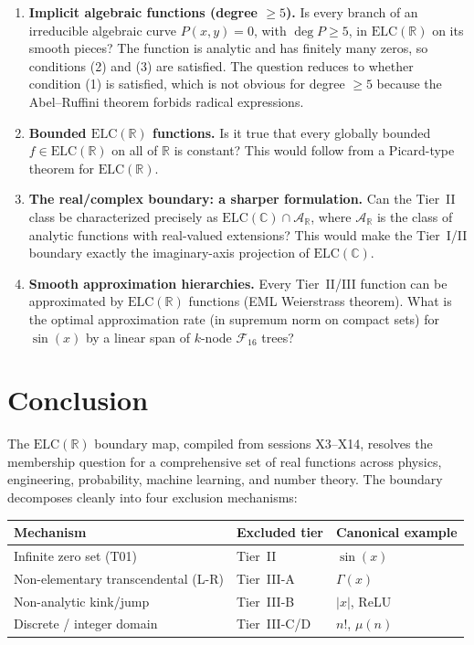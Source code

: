 \documentclass[12pt,a4paper]{article}
\theoremstyle{definition}
\newcommand{\ELC}{\mathrm{ELC}(\mathbb{R})}
\newcommand{\ELCcx}{\mathrm{ELC}(\mathbb{C})}
\newcommand{\R}{\mathbb{R}}
\newcommand{\F}{\mathcal{F}_{16}}
\begin{document}
\begin{enumerate}[label=\textbf{Q\arabic*.}, itemsep=6pt]

\item \textbf{Implicit algebraic functions (degree $\ge 5$).}
  Is every branch of an irreducible algebraic curve $P(x,y)=0$, with
  $\deg P\ge 5$, in $\ELC$ on its smooth pieces?  The function is analytic
  and has finitely many zeros, so conditions (2) and (3) are satisfied.
  The question reduces to whether condition (1) is satisfied, which is not
  obvious for degree $\ge 5$ because the Abel--Ruffini theorem forbids
  radical expressions.

\item \textbf{Bounded $\ELC$ functions.}
  Is it true that every globally bounded $f\in\ELC$ on all of $\R$ is
  constant?  This would follow from a Picard-type theorem for $\ELC$.

\item \textbf{The real/complex boundary: a sharper formulation.}
  Can the Tier~II class be characterized precisely as
  $\ELCcx \cap \mathcal{A}_\R$, where $\mathcal{A}_\R$ is the class of
  analytic functions with real-valued extensions?  This would make the
  Tier~I/II boundary exactly the imaginary-axis projection of $\ELCcx$.

\item \textbf{Smooth approximation hierarchies.}
  Every Tier~II/III function can be approximated by $\ELC$ functions
  (EML Weierstrass theorem).  What is the optimal approximation rate
  (in supremum norm on compact sets) for $\sin(x)$ by a linear span of
  $k$-node $\F$ trees?

\end{enumerate}

\section{Conclusion}
\label{sec:conclusion}

The $\ELC$ boundary map, compiled from sessions X3--X14, resolves the
membership question for a comprehensive set of real functions across
physics, engineering, probability, machine learning, and number theory.
The boundary decomposes cleanly into four exclusion mechanisms:

\begin{center}
\renewcommand{\arraystretch}{1.3}
\begin{tabular}{@{}lll@{}}
\toprule
Mechanism & Excluded tier & Canonical example \\
\midrule
Infinite zero set (T01)             & Tier~II      & $\sin(x)$ \\
Non-elementary transcendental (L-R) & Tier~III-A   & $\Gamma(x)$ \\
Non-analytic kink/jump              & Tier~III-B   & $|x|$, ReLU \\
Discrete / integer domain           & Tier~III-C/D & $n!$, $\mu(n)$ \\
\bottomrule
\end{tabular}
\end{center}
\end{document}

